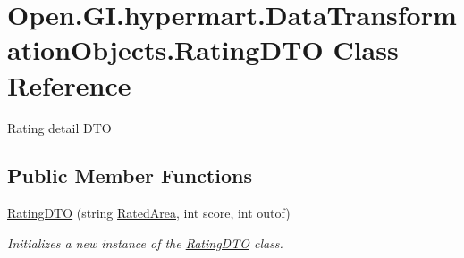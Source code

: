 \hypertarget{class_open_1_1_g_i_1_1hypermart_1_1_data_transformation_objects_1_1_rating_d_t_o}{}\section{Open.\+G\+I.\+hypermart.\+Data\+Transformation\+Objects.\+Rating\+D\+TO Class Reference}
\label{class_open_1_1_g_i_1_1hypermart_1_1_data_transformation_objects_1_1_rating_d_t_o}


Rating detail D\+TO  


\subsection*{Public Member Functions}
\begin{DoxyCompactItemize}
\item 
\hyperlink{class_open_1_1_g_i_1_1hypermart_1_1_data_transformation_objects_1_1_rating_d_t_o_ab6f971e21c62e4004fdc0b20d1fea033}{Rating\+D\+TO} (string \hyperlink{class_open_1_1_g_i_1_1hypermart_1_1_data_transformation_objects_1_1_rating_d_t_o_ad3282fe707334d675bc3c99694dff533}{Rated\+Area}, int score, int outof)
\begin{DoxyCompactList}\small\item\em Initializes a new instance of the \hyperlink{class_open_1_1_g_i_1_1hypermart_1_1_data_transformation_objects_1_1_rating_d_t_o}{Rating\+D\+TO} class. \end{DoxyCompactList}\end{DoxyCompactItemize}
